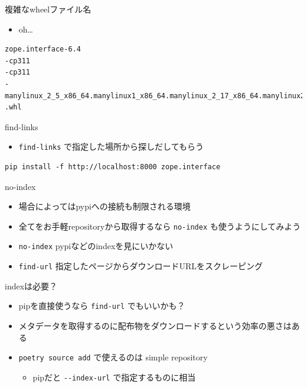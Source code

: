 \documentclass[presentation]{beamer}
\begin{document}
\begin{frame}[label={sec:orgc1d5488},fragile]{複雑なwheelファイル名}
 \begin{itemize}
\item oh\ldots{}
\end{itemize}
\begin{verbatim}
zope.interface-6.4
-cp311
-cp311
-manylinux_2_5_x86_64.manylinux1_x86_64.manylinux_2_17_x86_64.manylinux2014_x86_64
.whl
\end{verbatim}
\end{frame}
\begin{frame}[label={sec:org1f55e23},fragile]{find-links}
 \begin{itemize}
\item \texttt{find-links} で指定した場所から探しだしてもらう
\end{itemize}
\begin{verbatim}
pip install -f http://localhost:8000 zope.interface
\end{verbatim}
\end{frame}

\begin{frame}[label={sec:org4a53057},fragile]{no-index}
 \begin{itemize}
\item 場合によってはpypiへの接続も制限される環境
\item 全てをお手軽repositoryから取得するなら \texttt{no-index} も使うようにしてみよう

\item \texttt{no-index} pypiなどのindexを見にいかない
\item \texttt{find-url} 指定したページからダウンロードURLをスクレーピング
\end{itemize}
\end{frame}

\begin{frame}[label={sec:orgfb6905e},fragile]{indexは必要？}
 \begin{itemize}
\item pipを直接使うなら \texttt{find-url} でもいいかも？
\item メタデータを取得するのに配布物をダウンロードするという効率の悪さはある
\item \texttt{poetry source add} で使えるのは simple repository
\begin{itemize}
\item pipだと \texttt{-{}-{}index-url} で指定するものに相当
\end{itemize}
\end{itemize}
\end{frame}
\end{document}
